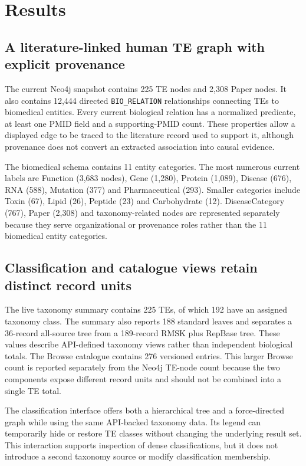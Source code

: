 \section{Results}

\subsection{A literature-linked human TE graph with explicit provenance}

The current Neo4j snapshot contains 225 TE nodes and 2,308 Paper nodes. It also contains 12,444 directed \texttt{BIO\_RELATION} relationships connecting TEs to biomedical entities. Every current biological relation has a normalized predicate, at least one PMID field and a supporting-PMID count. These properties allow a displayed edge to be traced to the literature record used to support it, although provenance does not convert an extracted association into causal evidence.

The biomedical schema contains 11 entity categories. The most numerous current labels are Function (3,683 nodes), Gene (1,280), Protein (1,089), Disease (676), RNA (588), Mutation (377) and Pharmaceutical (293). Smaller categories include Toxin (67), Lipid (26), Peptide (23) and Carbohydrate (12). DiseaseCategory (767), Paper (2,308) and taxonomy-related nodes are represented separately because they serve organizational or provenance roles rather than the 11 biomedical entity categories.



\subsection{Classification and catalogue views retain distinct record units}

The live taxonomy summary contains 225 TEs, of which 192 have an assigned taxonomy class. The summary also reports 188 standard leaves and separates a 36-record all-source tree from a 189-record RMSK plus RepBase tree. These values describe API-defined taxonomy views rather than independent biological totals. The Browse catalogue contains 276 versioned entries. This larger Browse count is reported separately from the Neo4j TE-node count because the two components expose different record units and should not be combined into a single TE total.

The classification interface offers both a hierarchical tree and a force-directed graph while using the same API-backed taxonomy data. Its legend can temporarily hide or restore TE classes without changing the underlying result set. This interaction supports inspection of dense classifications, but it does not introduce a second taxonomy source or modify classification membership.

